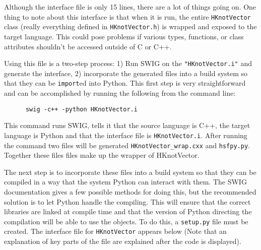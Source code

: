     \noindent Although the interface file is only 15 lines, there are a lot of things going on. One thing to note about this interface is that when it is run, the entire \texttt{HKnotVector} class (really everything defined in \texttt{HKnotVector.h}) is wrapped and exposed to the target language. This could pose problems if various types, functions, or class attributes shouldn't be accessed outside of C or C++.

    Using this file is a two-step process: 1) Run SWIG on the \texttt{"HKnotVector.i"} and generate the interface, 2) incorporate the generated files into a build system so that they can be \texttt{import}ed into Python. This first step is very straightforward and can be accomplished by running the following from the command line:

    \vspace{.2in}
    \begin{lstlisting}
      swig -c++ -python HKnotVector.i
    \end{lstlisting}
    \mainstretch{}

    \noindent This command runs SWIG, tells it that the source language is C++, the target language is Python and that the interface file is \texttt{HKnotVector.i}. After running the command two files will be generated \texttt{HKnotVector\_wrap.cxx} and \texttt{hsfpy.py}. Together these files files make up the wrapper of HKnotVector.

    The next step is to incorporate these files into a build system so that they can be compiled in a way that the system Python can interact with them. The SWIG documentation gives a few possible methods for doing this, but the recommended solution is to let Python handle the compiling. This will ensure that the correct libraries are linked at compile time and that the version of Python directing the compilation will be able to use the objects. To do this, a \texttt{setup.py} file must be created. The interface file for \texttt{HKnotVector} appears below (Note that an explanation of key parts of the file are explained after the code is displayed).

    \vspace{.2in}
    

